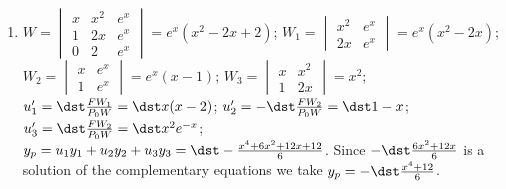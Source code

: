\documentclass[openany]{book}
\newenvironment{sectionSolutions}{
 \begin{enumerate}[item-label={\thesection.\arabic{enumi}.}]
}{
 \end{enumerate}
}
\begin{document}
\begin{sectionSolutions}
The general solution is
$y=-\dst\frac{e^x(3x+1)x}{2}+c_1e^x+c_2e^{2x}+c_3xe^{-x}$, so
\[
\begin{bmatrix}
y\\y'\\y''
\end{bmatrix}=
\begin{bmatrix}
-\dst\frac{e^x(3x+1)x}{ 2}\\
-\dst\frac{e^x(3x^2+7x+1)}{ 2}\\
-\dst\frac{e^x(3x^2+13x+8)}{ 2}
\end{bmatrix}+
\begin{vmatrix}
e^x&e^{2x}&xe^{-x}\\e^x&2e^{2x}&e^{-x}(1-x)\\e^x&4e^{2x}&e
^{-x}(x-2)\end{vmatrix}
\threecol{c_1}{c_2}{c_3}.
\]
Setting $x=0$  and imposing the initial conditions yields
\[
\begin{bmatrix}
-4\\-\frac{3}{2}\\-19
\end{bmatrix}=
\begin{bmatrix}
0\\-\frac{1}{2}\\-4
\end{bmatrix}+
\threebythree11012114{-2}
\threecol{c_1}{c_2}{c_3}.
\]
Solving this system yields $c_1=-3$, $c_2=-1$, $c_3=4$.
Therefore,
$y=-\dst\frac{e^x(3x+1)x}{2}-3e^x-e^{2x}+4xe^{-x}$.





\item
$W=\begin{vmatrix}
x&x^2&e^x\\1&2x&e^x\\0&2&e^x\end{vmatrix}=e^x(x^2-2x+2)$;
$W_1=\begin{vmatrix}
x^2&e^x\\2x&e^x\end{vmatrix}=e^x(x^2-2x)$;
$W_2=\begin{vmatrix}x&e^x\\1&e^x\end{vmatrix}=e^x(x-1)$;
$W_3=\begin{vmatrix}x&x^2\\1&2x\end{vmatrix}=x^2$;
$u_1'=\dst\frac{FW_1}{ P_0W}=\dst x(x-2)$;
$u_2'=-\dst\frac{FW_2}{ P_0W}=\dst1-x$;
$u_3'=\dst\frac{FW_2}{ P_0W}=\dst x^2e^{-x}$;
$y_p=u_1y_1+u_2y_2+u_3y_3=\dst-\frac{x^4+6x^2+12x+12}{ 6}$. Since
$-\dst\frac{6x^2+12x}{6}$ is a solution of the complementary equations
we take $y_p=-\dst\frac{x^4+12}{6}$.


\end{sectionSolutions}
\end{document}
